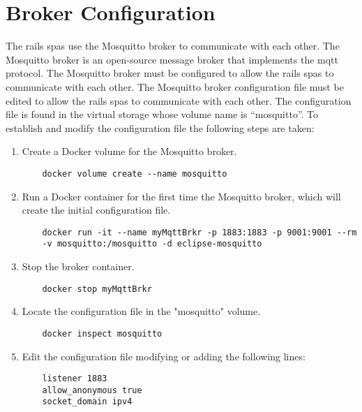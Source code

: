 \section{Broker Configuration}
\label{sec:brokerconfig}
The \gls{rails} \glspl{spa} use the Mosquitto broker to communicate with each other. The Mosquitto broker is an open-source message broker that implements the \gls{mqtt} protocol. The Mosquitto broker 
must be configured to allow the \gls{rails} \glspl{spa} to communicate with each other. The Mosquitto broker configuration file must be edited to allow the \gls{rails} \glspl{spa} to communicate with 
each other. The configuration file is found in the virtual storage whose volume name is “mosquitto”. To establish and modify the configuration file the following steps are taken:
\begin{enumerate}
    \item Create a Docker volume for the Mosquitto broker.
    \begin{verbatim}
    docker volume create --name mosquitto
    \end{verbatim}
    \item Run a Docker container for the first time the Mosquitto broker, which will create the initial configuration file.
    \begin{verbatim}
    docker run -it --name myMqttBrkr -p 1883:1883 -p 9001:9001 --rm
    -v mosquitto:/mosquitto -d eclipse-mosquitto
    \end{verbatim}
    \item Stop the broker container.
    \begin{verbatim}    
    docker stop myMqttBrkr
    \end{verbatim}
    \item Locate the configuration file in the "mosquitto" volume.
    \begin{verbatim}    
    docker inspect mosquitto
    \end{verbatim}
    \item Edit the configuration file modifying or adding the following lines:
    \begin{verbatim}
    listener 1883
    allow_anonymous true
    socket_domain ipv4
    \end{verbatim}
\end{enumerate}

